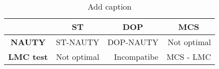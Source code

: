 \begin{table}[htbp]
  \centering
  \caption{Add caption}
    \begin{tabular}{crrr}
      & \multicolumn{1}{c}{\textbf{ST}} & \multicolumn{1}{c}{\textbf{DOP}} & \multicolumn{1}{c}{\textbf{MCS}} \\
    \midrule
    \textbf{NAUTY} & ST-NAUTY & DOP-NAUTY & \textcolor[rgb]{ 1,  0,  0}{Not optimal} \\
    \textbf{LMC test} & \textcolor[rgb]{ 1,  0,  0}{Not optimal} & \textcolor[rgb]{ 1,  0,  0}{Incompatibe} & MCS - LMC \\
    \bottomrule
    \end{tabular}%
  \label{tab:addlabel}%
\end{table}%
